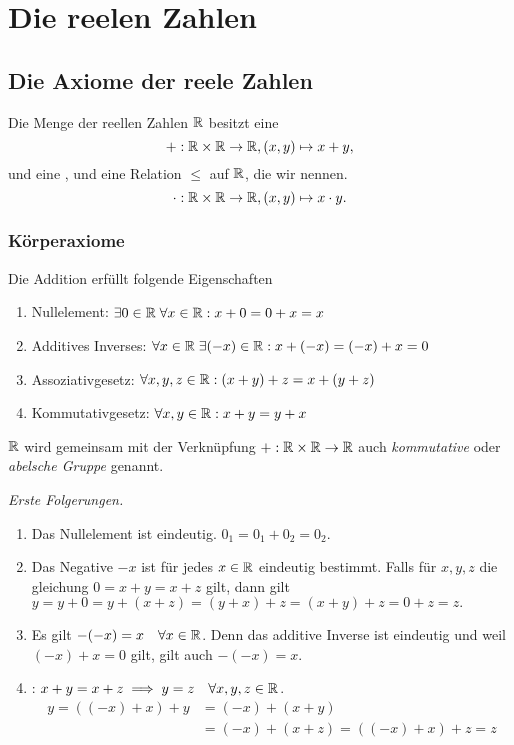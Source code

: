 \section{Die reelen Zahlen}

\subsection{Die Axiome der reele Zahlen}

\begin{mydef}
  Die Menge der reellen Zahlen $\mathbb{R}$ besitzt eine 
  \[
    +: \mathbb{R} \times \mathbb{R} \to \mathbb{R}, (x,y) \mapsto x+y,
  \]
  und eine , und eine Relation $\leq$ auf $\mathbb{R}$, die wir  nennen.
  \[
    \cdot: \mathbb{R} \times \mathbb{R} \to \mathbb{R}, (x,y) \mapsto x\cdot y.
  \]
\end{mydef}

\subsubsection{Körperaxiome}

Die Addition erfüllt folgende Eigenschaften
\begin{enumerate}[label=\textbf{(\alph*)}]
  \item Nullelement: $\exists 0 \in \mathbb{R} \; \forall x \in \mathbb{R}: x + 0 = 0 + x = x$
  \item Additives Inverses: $\forall x \in \mathbb{R} \; \exists (-x) \in \mathbb{R}: x + (-x) = (-x) + x = 0$
  \item Assoziativgesetz: $\forall x,y,z \in \mathbb{R}: (x+y)+z = x+(y+z)$
  \item Kommutativgesetz: $\forall x,y \in \mathbb{R}: x+y = y + x$
\end{enumerate}
$\mathbb{R}$ wird gemeinsam mit der Verknüpfung $+: \mathbb{R} \times \mathbb{R} \to \mathbb{R}$ auch \emph{kommutative} oder \emph{abelsche Gruppe} genannt.

\emph{Erste Folgerungen.}
\begin{enumerate}
  \item Das Nullelement ist eindeutig. $0_1 = 0_1 + 0_2 = 0_2$.
  \item Das Negative $-x$ ist für jedes $x \in \mathbb{R}$ eindeutig bestimmt. Falls für $x,y,z$ die gleichung $0=x+y=x+z$ gilt, dann gilt $y=y+0=y+(x+z)=(y+x)+z=(x+y)+z=0+z=z.$
  \item Es gilt $-(-x) = x \quad \forall x \in \mathbb{R}$. Denn das additive Inverse ist eindeutig und weil $(-x) + x = 0$ gilt, gilt auch $-(-x) = x$.
  \item {}: $x + y = x + z \implies y=z \quad \forall x,y,z \in \mathbb{R}$.
  \[
    \begin{aligned}
      y = ((-x)+x)+y &= (-x)+(x+y) \\
      &=(-x)+(x+z) = ((-x)+x)+z = z
    \end{aligned}
  \]
\end{enumerate}

